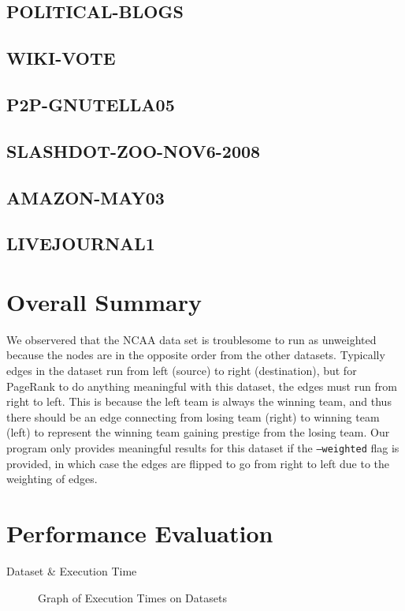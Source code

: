 \documentclass{report}
\begin{document}
\subsection{POLITICAL-BLOGS}
\subsection{WIKI-VOTE}
\subsection{P2P-GNUTELLA05}
\subsection{SLASHDOT-ZOO-NOV6-2008}
\subsection{AMAZON-MAY03}
\subsection{LIVEJOURNAL1}

\section{Overall Summary}
We observered that the NCAA data set is troublesome to run as unweighted because
the nodes are in the opposite order from the other datasets. Typically edges in
the dataset run from left (source) to right (destination), but for PageRank to
do anything meaningful with this dataset, the edges must run from right to left.
This is because the left team is always the winning team, and thus there should
be an edge connecting from losing team (right) to winning team (left) to
represent the winning team gaining prestige from the losing team. Our program
only provides meaningful results for this dataset if the \texttt{--weighted}
flag is provided, in which case the edges are flipped to go from right to left
due to the weighting of edges.

\section{Performance Evaluation}
\begin{table}
  \centering
  \begin{tabular}{}
    \toprule
    Dataset & Execution Time\\
    \midrule
    \bottomrule
  \end{tabular}
  \caption{Execution Times on Datasets}
  \label{execution-times-table}
\end{table}
\begin{figure}
  \centering
  
  \caption{Graph of Execution Times on Datasets}
  \label{execution-times-graph}
\end{figure}
\appendix
\end{document}

